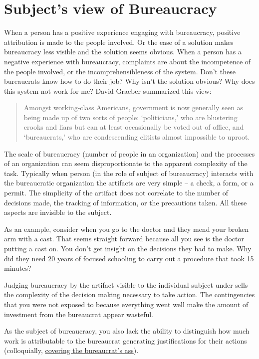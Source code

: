 \section{Subject's view of Bureaucracy\label{sec:subjects-view}}


When a person has a positive experience engaging with bureaucracy, positive attribution is made to the people involved. Or the ease of a solution makes bureaucracy less visible and the solution seems obvious. 
When a person has a negative experience with bureaucracy, complaints are about the incompetence of the people involved, or the incomprehensibleness of the system. Don't these bureaucrats know how to do their job? Why isn't the solution obvious? Why does this system not work for me? David Graeber summarized this view:
\begin{quote}
 Amongst working-class Americans, government is now generally seen as being made up of two sorts of people: `politicians,' who are blustering crooks and liars but can at least occasionally be voted out of office, and `bureaucrats,' who are condescending elitists almost impossible to uproot.   
\end{quote}

The scale of bureaucracy (number of people in an organization) and the processes of an organization can seem disproportionate to the apparent complexity of the task. Typically when person (in the role of subject of bureaucracy) interacts with the bureaucratic organization the artifacts are very simple -- a check, a form, or a permit. The simplicity of the artifact does not correlate to the number of decisions made, the tracking of information, or the precautions taken. All these aspects are invisible to the subject.

As an example, consider when you go to the doctor and they mend your broken arm with a cast. That seems straight forward because all you see is the doctor putting a cast on. You don't get insight on the decisions they had to make. Why did they need 20 years of focused schooling to carry out a procedure that took 15 minutes?

Judging bureaucracy by the artifact visible to the individual subject under sells the complexity of the decision making necessary to take action. The contingencies that you were not exposed to because everything went well make the amount of investment from the bureaucrat appear wasteful.

As the subject of bureaucracy, you also lack the ability to distinguish how much work is attributable to the bureaucrat generating justifications for their actions (colloquially, \href{https://en.wikipedia.org/wiki/Cover_your_ass}{covering the bureaucrat's ass}). 

